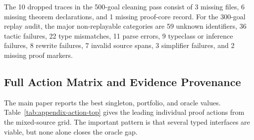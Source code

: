 \documentclass{article}
\begin{document}
The 10 dropped traces in the 500-goal cleaning pass consist of 3 missing files, 6 missing theorem declarations, and 1 missing proof-core record. For the 300-goal replay audit, the major non-replayable categories are 59 unknown identifiers, 36 tactic failures, 22 type mismatches, 11 parse errors, 9 typeclass or inference failures, 8 rewrite failures, 7 invalid source spans, 3 simplifier failures, and 2 missing proof markers.

\subsection{Full Action Matrix and Evidence Provenance}

The main paper reports the best singleton, portfolio, and oracle values. Table~\ref{tab:appendix-action-top} gives the leading individual proof actions from the mixed-source grid. The important pattern is that several typed interfaces are viable, but none alone closes the oracle gap.

\begin{table}[H]
\caption{Leading single actions in the mixed-source 230-goal grid. Mean facts and simp rules are measured over attempted goals for that action.}
\label{tab:appendix-action-top}
\centering
\small
{}
\end{table}
\end{document}
